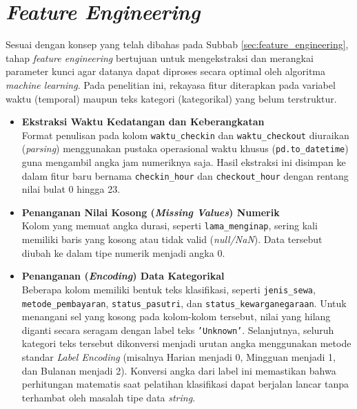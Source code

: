 \section{\textit{Feature Engineering}}

Sesuai dengan konsep yang telah dibahas pada Subbab \ref{sec:feature_engineering}, tahap \textit{feature engineering} bertujuan untuk mengekstraksi dan merangkai parameter kunci agar datanya dapat diproses secara optimal oleh algoritma \textit{machine learning}. Pada penelitian ini, rekayasa fitur diterapkan pada variabel waktu (temporal) maupun teks kategori (kategorikal) yang belum terstruktur.
\begin{itemize}
    \item \textbf{Ekstraksi Waktu Kedatangan dan Keberangkatan}\\ Format penulisan pada kolom \texttt{waktu\_checkin} dan \texttt{waktu\_checkout} diuraikan (\textit{parsing}) menggunakan pustaka operasional waktu khusus (\texttt{pd.to\_datetime}) guna mengambil angka jam numeriknya saja. Hasil ekstraksi ini disimpan ke dalam fitur baru bernama \texttt{checkin\_hour} dan \texttt{checkout\_hour} dengan rentang nilai bulat 0 hingga 23.
    \item \textbf{Penanganan Nilai Kosong (\textit{Missing Values}) Numerik}\\ Kolom yang memuat angka durasi, seperti \texttt{lama\_menginap}, sering kali memiliki baris yang kosong atau tidak valid (\textit{null/NaN}). Data tersebut diubah ke dalam tipe numerik menjadi angka $0$.
    \item \textbf{Penanganan (\textit{Encoding}) Data Kategorikal}\\ Beberapa kolom memiliki bentuk teks klasifikasi, seperti \texttt{jenis\_sewa}, \texttt{metode\_pembayaran}, \texttt{status\_pasutri}, dan \texttt{status\_kewarganegaraan}. Untuk menangani sel yang kosong pada kolom-kolom tersebut, nilai yang hilang diganti secara seragam dengan label teks \texttt{'Unknown'}. Selanjutnya, seluruh kategori teks tersebut dikonversi menjadi urutan angka menggunakan metode standar \textit{Label Encoding} (misalnya Harian menjadi 0, Mingguan menjadi 1, dan Bulanan menjadi 2). Konversi angka dari label ini memastikan bahwa perhitungan matematis saat pelatihan klasifikasi dapat berjalan lancar tanpa terhambat oleh masalah tipe data \textit{string}. 
\end{itemize}